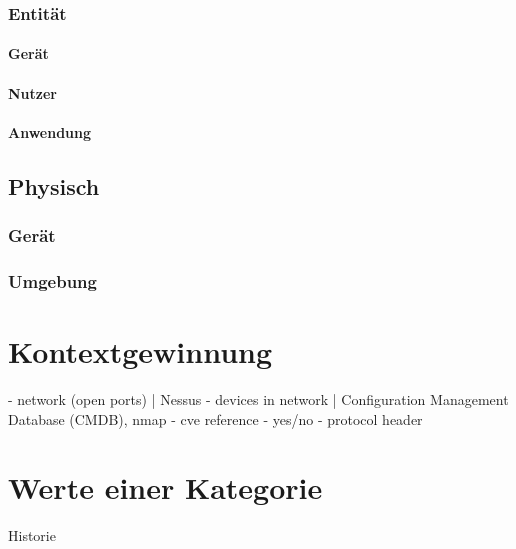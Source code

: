 \subsubsection{Entität}
\paragraph{Gerät}
\paragraph{Nutzer}
\paragraph{Anwendung}

\subsection{Physisch}
\subsubsection{Gerät}
\subsubsection{Umgebung}

\section{Kontextgewinnung}
- network (open ports) | Nessus
- devices in network | Configuration Management Database (CMDB), nmap   
- cve reference - yes/no
- protocol header
\section{Werte einer Kategorie}


Historie
